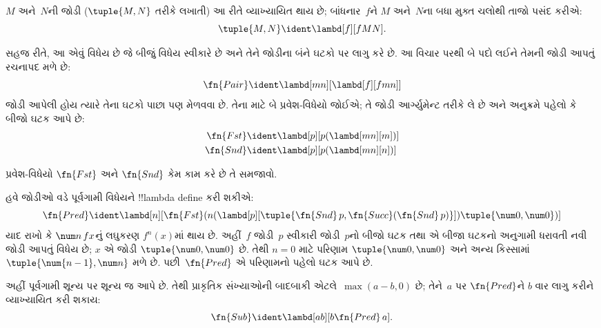\documentclass[../../../include/open-logic-section]{subfiles}
\begin{document}

\begin{defn}
$M$ અને~$N$ની જોડી ($\tuple{M,N}$ તરીકે લખાતી)
આ રીતે વ્યાખ્યાયિત થાય છે; બાંધનાર~$f$ને
$M$ અને~$N$ના બધા મુક્ત ચલોથી તાજો પસંદ કરીએ:
\[
\tuple{M,N} \ident \lambd[f][fMN].
\]
\end{defn}
  
સહજ રીતે, આ એવું વિધેય છે જે બીજું વિધેય
સ્વીકારે છે અને તેને જોડીના બંને ઘટકો પર લાગુ
કરે છે. આ વિચાર પરથી બે પદો લઈને તેમની
જોડી આપતું રચનાપદ મળે છે:
\[
  \fn{Pair} \ident \lambd[mn][\lambd[f][fmn]]
\]
જોડી આપેલી હોય ત્યારે તેના ઘટકો પાછા પણ
મેળવવા છે. તેના માટે બે પ્રવેશ-વિધેયો જોઈએ;
તે જોડી આર્ગ્યુમેન્ટ તરીકે લે છે અને અનુક્રમે
પહેલો કે બીજો ઘટક આપે છે:
\begin{align*}
  \fn{Fst} & \ident \lambd[p][p(\lambd[mn][m])]\\
  \fn{Snd} & \ident \lambd[p][p(\lambd[mn][n])]
\end{align*}

\begin{prob}
  પ્રવેશ-વિધેયો $\fn{Fst}$ અને $\fn{Snd}$
  કેમ કામ કરે છે તે સમજાવો.
\end{prob}

હવે જોડીઓ વડે પૂર્વગામી વિધેયને !!{lambda define}
કરી શકીએ:
\[
  \fn{Pred} \ident \lambd[n][\fn{Fst}(n (\lambd[p][\tuple{\fn{Snd}\, {p}, \fn{Succ}(\fn{Snd}\, {p})}]) \tuple{\num 0, \num 0})]
\]
યાદ રાખો કે $\num n\, f x$નું લઘુકરણ
$f^{n}(x)$માં થાય છે. અહીં~$f$ જોડી~$p$
સ્વીકારી જોડી~$p$નો બીજો ઘટક તથા એ બીજા ઘટકનો
અનુગામી ધરાવતી નવી જોડી આપતું વિધેય છે;
$x$ એ જોડી $\tuple{\num 0,\num 0}$ છે.
તેથી $n=0$ માટે પરિણામ $\tuple{\num 0,\num 0}$
અને અન્ય કિસ્સામાં $\tuple{\num{n-1}, \num n}$
મળે છે. પછી~$\fn{Pred}$ એ પરિણામનો
પહેલો ઘટક આપે છે.

અહીં પૂર્વગામી શૂન્ય પર શૂન્ય જ આપે છે. તેથી પ્રાકૃતિક
સંખ્યાઓની બાદબાકી એટલે~$\max(a-b,0)$ છે; તેને~$a$ પર $\fn{Pred}$ને $b$ વાર
લાગુ કરીને વ્યાખ્યાયિત કરી શકાય:
\[
\fn{Sub} \ident \lambd[ab][b \fn{Pred}\, a].
\]
    
\end{document}
